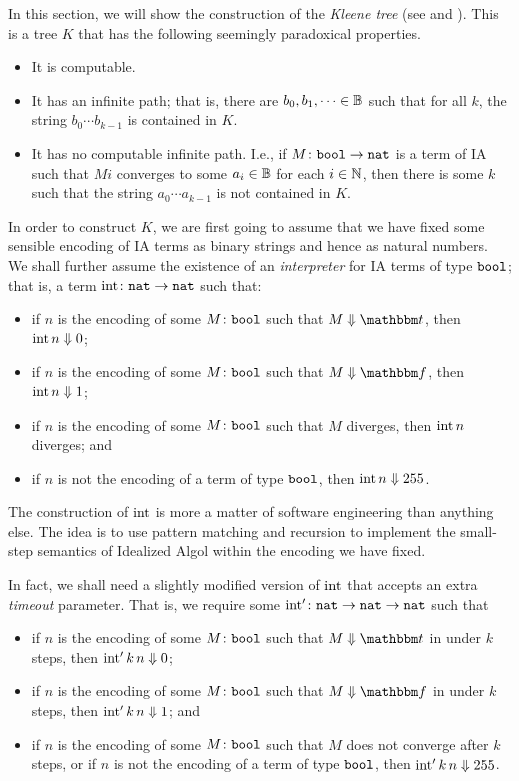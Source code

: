 In this section, we will show the construction of the \emph{Kleene tree} (see \cite[4.5]{Joshua} and \cite{KleeneTree}).  
This is a tree $K$ that has the following seemingly paradoxical properties.
\begin{itemize}
  \item It is computable.
  \item It has an infinite path; that is, there are $b_0,b_1,\cdots\in\mathbb{B}$ such that for all $k$, the string $b_0\cdots b_{k-1}$ is contained in $K$.
  \item It has no computable infinite path.  
    I.e., if $M \colon {\mathtt{bool}} \to {\mathtt{nat}}$ is a term of IA such that $M i$ converges to some $a_i\in \mathbb{B}$ for each $i\in \mathbb{N}$, then there is some $k$ such that the string $a_0 \cdots a_{k-1}$ is not contained in $K$.
\end{itemize}

In order to construct $K$, we are first going to assume that we have fixed some sensible encoding of IA terms as binary strings and hence as natural numbers.  
We shall further assume the existence of an \emph{interpreter} for IA terms of type ${\mathtt{bool}}$; that is, a term $\operatorname{int} \colon {\mathtt{nat}} \to {\mathtt{nat}}$ such that:
\begin{itemize}
  \item if $n$ is the encoding of some $M \colon {\mathtt{bool}}$ such that $M \converges \true$, then $\operatorname{int} n \Downarrow 0$;
  \item if $n$ is the encoding of some $M \colon {\mathtt{bool}}$ such that $M \converges \false$, then $\operatorname{int} n \Downarrow 1$; 
  \item if $n$ is the encoding of some $M \colon {\mathtt{bool}}$ such that $M$ diverges, then $\operatorname{int} n$ diverges; and
  \item if $n$ is not the encoding of a term of type ${\mathtt{bool}}$, then $\operatorname{int} n\Downarrow 255$.
\end{itemize}

The construction of $\operatorname{int}$ is more a matter of software engineering than anything else.  
The idea is to use pattern matching and recursion to implement the small-step semantics of Idealized Algol within the encoding we have fixed.

In fact, we shall need a slightly modified version of $\operatorname{int}$ that accepts an extra \emph{timeout} parameter.  
That is, we require some $\operatorname{int}'\colon {\mathtt{nat}} \to {\mathtt{nat}} \to {\mathtt{nat}}$ such that
\begin{itemize}
  \item if $n$ is the encoding of some $M \colon {\mathtt{bool}}$ such that $M\converges\true$ in under $k$ steps, then $\operatorname{int}' k\,n \Downarrow 0$;
  \item if $n$ is the encoding of some $M \colon {\mathtt{bool}}$ such that $M\converges\false$ in under $k$ steps, then $\operatorname{int}' k\,n \Downarrow 1$; and
  \item if $n$ is the encoding of some $M \colon {\mathtt{bool}}$ such that $M$ does not converge after $k$ steps, or if $n$ is not the encoding of a term of type ${\mathtt{bool}}$, then $\operatorname{int}' k\,n \Downarrow 255$.
\end{itemize}


